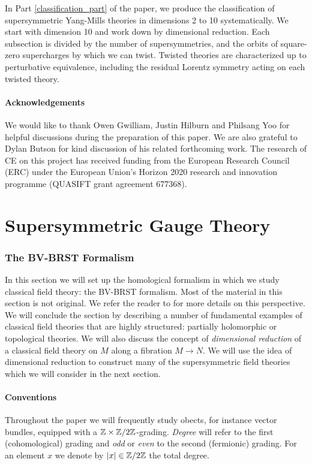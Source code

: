 \documentclass[10pt, oneside]{article}
\begin{document}
In Part \ref{classification_part} of the paper, we produce the classification of supersymmetric Yang-Mills theories in dimensions 2 to 10 systematically.  We start with dimension 10 and work down by dimensional reduction.  Each subsection is divided by the number of supersymmetries, and the orbits of square-zero supercharges by which we can twist.  Twisted theories are characterized up to perturbative equivalence, including the residual Lorentz symmetry acting on each twisted theory.

\subsection*{Acknowledgements}
We would like to thank Owen Gwilliam, Justin Hilburn and Philsang Yoo for helpful discussions during the preparation of this paper.  We are also grateful to Dylan Butson for kind discussion of his related forthcoming work.  The research of CE on this project has received funding from the European Research Council (ERC) under the European Union's Horizon 2020 research and innovation programme (QUASIFT grant agreement 677368).

\part{Supersymmetric Gauge Theory} \label{formalism_part}

\section{The BV-BRST Formalism} \label{BV_section}

In this section we will set up the homological formalism in which we study classical field theory: the BV-BRST formalism.  Most of the material in this section is not original.  We refer the reader to \cite{CostelloBook, Book2} for more details on this perspective.  We will conclude the section by describing a number of fundamental examples of classical field theories that are highly structured: partially holomorphic or topological theories.  We will also discuss the concept of \emph{dimensional reduction} of a classical field theory on $M$ along a fibration $M \to N$.  We will use the idea of dimensional reduction to construct many of the supersymmetric field theories which we will consider in the next section.  

\subsection{Conventions}
Throughout the paper we will frequently study obects, for instance vector bundles, equipped with a $\mathbb Z\times\mathbb Z/2\mathbb Z$-grading. \emph{Degree} will refer to the first (cohomological) grading and \emph{odd} or \emph{even} to the second (fermionic) grading.  For an element $x$ we denote by $|x|\in\mathbb Z/2\mathbb Z$ the total degree.
\end{document}
